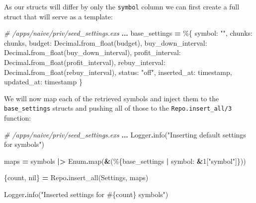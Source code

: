 \documentclass[
]{book}
\newenvironment{Shaded}{\begin{snugshade}}{\end{snugshade}}
\newcommand{\CommentTok}[1]{\textcolor[rgb]{0.56,0.35,0.01}{\textit{#1}}}
\newcommand{\ConstantTok}[1]{\textcolor[rgb]{0.00,0.00,0.00}{#1}}
\newcommand{\DecValTok}[1]{\textcolor[rgb]{0.00,0.00,0.81}{#1}}
\newcommand{\NormalTok}[1]{#1}
\newcommand{\OperatorTok}[1]{\textcolor[rgb]{0.81,0.36,0.00}{\textbf{#1}}}
\newcommand{\OtherTok}[1]{\textcolor[rgb]{0.56,0.35,0.01}{#1}}
\newcommand{\StringTok}[1]{\textcolor[rgb]{0.31,0.60,0.02}{#1}}
\newcommand{\VariableTok}[1]{\textcolor[rgb]{0.00,0.00,0.00}{#1}}
\begin{document}
As our structs will differ by only the \texttt{symbol} column we can first create a full struct that will serve as a template:

\begin{Shaded}
\begin{Highlighting}[]
\CommentTok{\# /apps/naive/priv/seed\_settings.exs}
\OperatorTok{...}
\NormalTok{base\_settings }\OperatorTok{=}\NormalTok{ \%\{}
  \VariableTok{symbol:} \StringTok{""}\NormalTok{,}
  \VariableTok{chunks:}\NormalTok{ chunks,}
  \VariableTok{budget:} \ConstantTok{Decimal}\OperatorTok{.}\NormalTok{from\_float(budget),}
  \VariableTok{buy\_down\_interval:} \ConstantTok{Decimal}\OperatorTok{.}\NormalTok{from\_float(buy\_down\_interval),}
  \VariableTok{profit\_interval:} \ConstantTok{Decimal}\OperatorTok{.}\NormalTok{from\_float(profit\_interval),}
  \VariableTok{rebuy\_interval:} \ConstantTok{Decimal}\OperatorTok{.}\NormalTok{from\_float(rebuy\_interval),}
  \VariableTok{status:} \StringTok{"off"}\NormalTok{,}
  \VariableTok{inserted\_at:}\NormalTok{ timestamp,}
  \VariableTok{updated\_at:}\NormalTok{ timestamp}
\NormalTok{\}}
\end{Highlighting}
\end{Shaded}

We will now map each of the retrieved symbols and inject them to the \texttt{base\_settings} structs and pushing all of those to the \texttt{Repo.insert\_all/3} function:

\begin{Shaded}
\begin{Highlighting}[]
\CommentTok{\# /apps/naive/priv/seed\_settings.exs}
\OperatorTok{...}
\ConstantTok{Logger}\OperatorTok{.}\NormalTok{info(}\StringTok{"Inserting default settings for symbols"}\NormalTok{)}

\NormalTok{maps }\OperatorTok{=}\NormalTok{ symbols}
  \OperatorTok{|\textgreater{}} \ConstantTok{Enum}\OperatorTok{.}\NormalTok{map(}\OperatorTok{\&}\NormalTok{(\%\{base\_settings }\OperatorTok{|} \VariableTok{symbol:} \OperatorTok{\&}\DecValTok{1}\NormalTok{[}\StringTok{"symbol"}\NormalTok{]\}))}

\NormalTok{\{count, }\ConstantTok{nil}\NormalTok{\} }\OperatorTok{=} \ConstantTok{Repo}\OperatorTok{.}\NormalTok{insert\_all(}\ConstantTok{Settings}\NormalTok{, maps)}

\ConstantTok{Logger}\OperatorTok{.}\NormalTok{info(}\StringTok{"Inserted settings for }\OtherTok{\#\{}\NormalTok{count}\OtherTok{\}}\StringTok{ symbols"}\NormalTok{)}
\end{Highlighting}
\end{Shaded}
\end{document}
